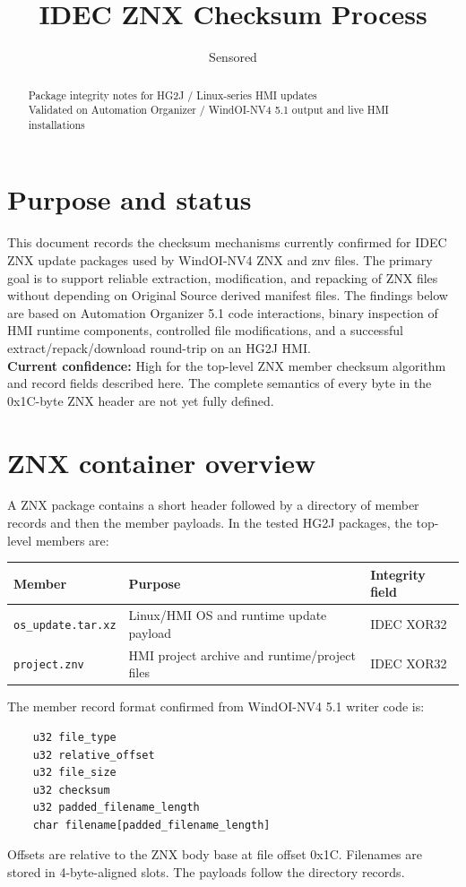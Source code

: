 \documentclass[]{article}
\title{IDEC ZNX Checksum Process}
\author{Sensored}
\begin{document}
\maketitle

\begin{abstract}
Package integrity notes for HG2J / Linux-series HMI updates\\
Validated on Automation Organizer / WindOI-NV4 5.1 output and live HMI installations
\end{abstract}

\section{Purpose and status}
This document records the checksum mechanisms currently confirmed for IDEC ZNX update packages used by WindOI-NV4 ZNX and znv files. The primary goal is to support reliable extraction, modification, and repacking of ZNX files without depending on Original Source derived manifest files. The findings below are based on Automation Organizer 5.1 code interactions, binary inspection of HMI runtime components, controlled file modifications, and a successful extract/repack/download round-trip on an HG2J HMI.\\
\textbf{Current confidence:} High for the top-level ZNX member checksum algorithm and record fields described here. The complete semantics of every byte in the 0x1C-byte ZNX header are not yet fully defined.

\section{ZNX container overview}
A ZNX package contains a short header followed by a directory of member records and then the member payloads. In the tested HG2J packages, the top-level members are:
\begin{center}
\begin{tabularx}{\textwidth}{@{}l X l@{}}
\toprule
\textbf{Member} & \textbf{Purpose} & \textbf{Integrity field} \\
\midrule
\texttt{os\_update.tar.xz} & Linux/HMI OS and runtime update payload & IDEC XOR32 \\
\texttt{project.znv} & HMI project archive and runtime/project files & IDEC XOR32 \\
\bottomrule
\end{tabularx}
\end{center}
The member record format confirmed from WindOI-NV4 5.1 writer code is:
\begin{verbatim}
	u32 file_type
	u32 relative_offset
	u32 file_size
	u32 checksum
	u32 padded_filename_length
	char filename[padded_filename_length]
\end{verbatim}	
Offsets are relative to the ZNX body base at file offset 0x1C. Filenames are stored in 4-byte-aligned slots. The payloads follow the directory records.
\end{document}
